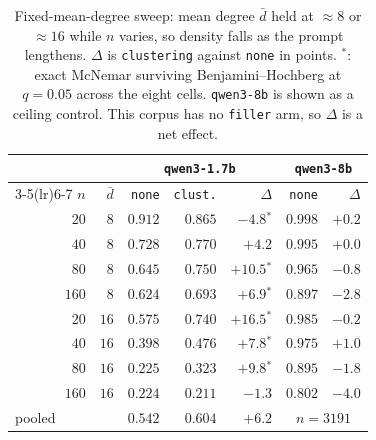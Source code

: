 \begin{table}[t]
\centering\small
\setlength{\tabcolsep}{3.5pt}
\begin{tabular}{rrrrrrr}
\toprule
& & \multicolumn{3}{c}{\texttt{qwen3-1.7b}} & \multicolumn{2}{c}{\texttt{qwen3-8b}} \\
\cmidrule(lr){3-5}\cmidrule(lr){6-7}
$n$ & $\bar{d}$ & \texttt{none} & \texttt{clust.} & $\Delta$ & \texttt{none} & $\Delta$ \\
\midrule
$20$ & $8$ & $0.912$ & $0.865$ & $-4.8$$^{*}$ & $0.998$ & $+0.2$ \\
$40$ & $8$ & $0.728$ & $0.770$ & $+4.2$ & $0.995$ & $+0.0$ \\
$80$ & $8$ & $0.645$ & $0.750$ & $+10.5$$^{*}$ & $0.965$ & $-0.8$ \\
$160$ & $8$ & $0.624$ & $0.693$ & $+6.9$$^{*}$ & $0.897$ & $-2.8$ \\
$20$ & $16$ & $0.575$ & $0.740$ & $+16.5$$^{*}$ & $0.985$ & $-0.2$ \\
$40$ & $16$ & $0.398$ & $0.476$ & $+7.8$$^{*}$ & $0.975$ & $+1.0$ \\
$80$ & $16$ & $0.225$ & $0.323$ & $+9.8$$^{*}$ & $0.895$ & $-1.8$ \\
$160$ & $16$ & $0.224$ & $0.211$ & $-1.3$ & $0.802$ & $-4.0$ \\
\midrule
\multicolumn{2}{l}{pooled} & $0.542$ & $0.604$ & $\mathbf{+6.2}$ & \multicolumn{2}{c}{$n{=}3191$} \\
\bottomrule
\end{tabular}
\caption{Fixed-mean-degree sweep: mean degree $\bar{d}$ held at $\approx 8$ or $\approx 16$ while $n$ varies, so density falls as the prompt lengthens. $\Delta$ is \texttt{clustering} against \texttt{none} in points. $^{*}$: exact McNemar surviving Benjamini--Hochberg at $q{=}0.05$ across the eight cells. \texttt{qwen3-8b} is shown as a ceiling control. This corpus has no \texttt{filler} arm, so $\Delta$ is a net effect.}
\label{tab:degfixdeg}
\end{table}
